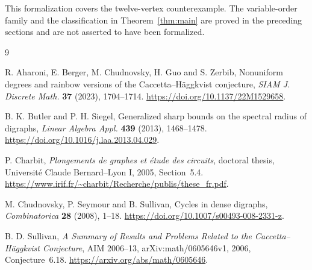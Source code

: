 \documentclass[11pt]{article}
\begin{document}
This formalization covers the twelve-vertex counterexample. The variable-order family and the classification in Theorem~\ref{thm:main} are proved in the preceding sections and are not asserted to have been formalized.

\begin{thebibliography}{9}

R. Aharoni, E. Berger, M. Chudnovsky, H. Guo and S. Zerbib,
Nonuniform degrees and rainbow versions of the Caccetta--H\"aggkvist conjecture,
\emph{SIAM J. Discrete Math.} \textbf{37} (2023), 1704--1714.
\url{https://doi.org/10.1137/22M1529658}.

B. K. Butler and P. H. Siegel,
Generalized sharp bounds on the spectral radius of digraphs,
\emph{Linear Algebra Appl.} \textbf{439} (2013), 1468--1478.
\url{https://doi.org/10.1016/j.laa.2013.04.029}.

P. Charbit, \emph{Plongements de graphes et \'etude des circuits},
doctoral thesis, Universit\'e Claude Bernard--Lyon I, 2005, Section~5.4.
\url{https://www.irif.fr/~charbit/Recherche/publis/these_fr.pdf}.

M. Chudnovsky, P. Seymour and B. Sullivan,
Cycles in dense digraphs, \emph{Combinatorica} \textbf{28} (2008), 1--18.
\url{https://doi.org/10.1007/s00493-008-2331-z}.

B. D. Sullivan,
\emph{A Summary of Results and Problems Related to the Caccetta--H\"aggkvist Conjecture},
AIM 2006--13, arXiv:math/0605646v1, 2006, Conjecture~6.18.
\url{https://arxiv.org/abs/math/0605646}.

\end{thebibliography}
\end{document}

